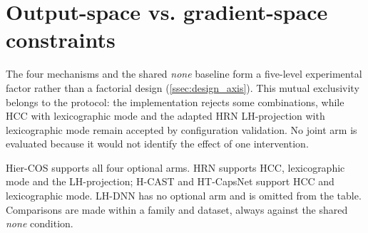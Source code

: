 \section{Output-space vs. gradient-space constraints}
\label{sec:results_mechanisms}

The four mechanisms and the shared \emph{none} baseline form a five-level
experimental factor rather than a factorial design (\cref{ssec:design_axis}).
This mutual exclusivity belongs to the protocol: the implementation rejects
some combinations, while HCC with lexicographic mode and the adapted HRN
LH-projection with lexicographic mode remain accepted by configuration
validation. No joint
arm is evaluated because it would not identify the effect of one intervention.

Hier-COS supports all four optional arms. HRN supports HCC, lexicographic mode
and the LH-projection; H-CAST and HT-CapsNet support HCC and lexicographic mode.
LH-DNN has no optional arm and is omitted from the table. Comparisons are made
within a family and dataset, always against the shared \emph{none} condition.

